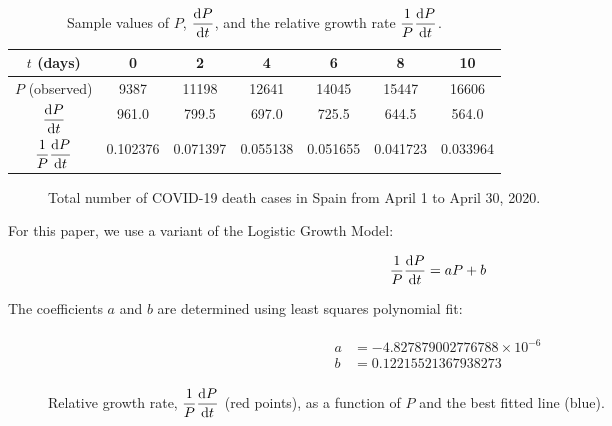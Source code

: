 \documentclass[12pt]{scrartcl}
\begin{document}

\begin{table}[h!]
\centering
\tabulinesep=1.2mm
\begin{tabu}{ |c|c|c|c|c|c|c| }
  \hline
  $t$ (days) & 0 & 2 & 4 & 6 & 8 & 10\\
  \hline
  $P$ (observed) & 9387 & 11198 & 12641 & 14045 & 15447 & 16606 \\
  \hline
  $\displaystyle\diff{P}{t}$ & 961.0 & 799.5 & 697.0 & 725.5 & 644.5 & 564.0 \\
  \hline
  $\dfrac{1}{P} \displaystyle\diff{P}{t}$ & 0.102376 & 0.071397 & 0.055138 & 0.051655 & 0.041723 & 0.033964 \\
  \hline
\end{tabu}
\caption{Sample values of $P$, $\displaystyle\diff{P}{t}$, and the relative growth rate $\dfrac{1}{P} \displaystyle\diff{P}{t}$.}
\label{table:2}
\end{table}

\begin{figure}[H]
  \begin{center}
    
  \end{center}
  \caption{Total number of COVID-19 death cases in Spain from April 1 to April 30, 2020.}
\end{figure}

For this paper, we use a variant of the Logistic Growth Model:

\begin{equation} \label{model_eqn}
\frac{1}{P} \diff{P}{t} = aP + b
\end{equation}

The coefficients $a$ and $b$ are determined using least squares polynomial fit:

\begin{align} \label{coef}
\begin{split}
a &= -4.827879002776788 \times 10^{-6} \\
b &= 0.12215521367938273
\end{split}
\end{align}

\begin{figure}[H]
  \begin{center}
    
  \end{center}
  \caption{Relative growth rate, $\dfrac{1}{P} \displaystyle\diff{P}{t}$ (red points), as a function of $P$ and the best fitted line (blue).}
\end{figure}
\end{document}
